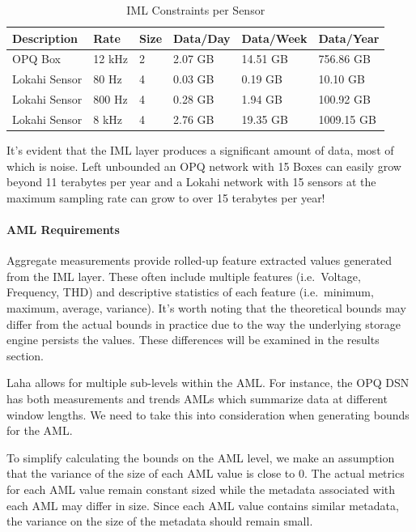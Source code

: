 \begin{table}[H]
	\centering
	\caption{IML Constraints per Sensor}
	\begin{tabularx}{\textwidth}{Xlllll}
		\toprule
		\textbf{Description} & \textbf{Rate} & \textbf{Size} & \textbf{Data/Day} & \textbf{Data/Week} & \textbf{Data/Year} \\
		\midrule
		OPQ Box & 12 kHz & 2 & 2.07 GB & 14.51 GB & 756.86 GB \\
		Lokahi Sensor & 80 Hz & 4 & 0.03 GB & 0.19 GB & 10.10 GB \\
		Lokahi Sensor & 800 Hz & 4 & 0.28 GB & 1.94 GB & 100.92 GB \\
		Lokahi Sensor & 8 kHz & 4 & 2.76 GB & 19.35 GB & 1009.15 GB \\
		\bottomrule
	\end{tabularx}
	\label{table:iml_size}
\end{table}

It's evident that the IML layer produces a significant amount of data, most of which is noise. Left unbounded an OPQ network with 15 Boxes can easily grow beyond 11 terabytes per year and a Lokahi network with 15 sensors at the maximum sampling rate can grow to over 15 terabytes per year!

\paragraph{AML Requirements}
Aggregate measurements provide rolled-up feature extracted values generated from the IML layer. These often include multiple features (i.e.\ Voltage, Frequency, THD) and descriptive statistics of each feature (i.e.\ minimum, maximum, average, variance). It's worth noting that the theoretical bounds may differ from the actual bounds in practice due to the way the underlying storage engine persists the values. These differences will be examined in the results section.

Laha allows for multiple sub-levels within the AML. For instance, the OPQ DSN has both measurements and trends AMLs which summarize data at different window lengths. We need to take this into consideration when generating bounds for the AML\@.

To simplify calculating the bounds on the AML level, we make an assumption that the variance of the size of each AML value is close to 0. The actual metrics for each AML value remain constant sized while the metadata associated with each AML may differ in size. Since each AML value contains similar metadata, the variance on the size of the metadata should remain small.

